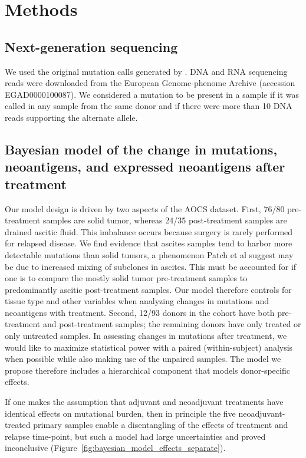 \section*{Methods}
\subsection*{Next-generation sequencing}
We used the original mutation calls generated by \cite{Patch_2015}. DNA and RNA sequencing reads were downloaded from the European Genome-phenome Archive (accession EGAD0000100087). We considered a mutation to be present in a sample if it was called in any sample from the same donor and if there were more than 10 DNA reads supporting the alternate allele.

\subsection*{Bayesian model of the change in mutations, neoantigens, and expressed neoantigens after treatment}
Our model design is driven by two aspects of the AOCS dataset. First, 76/80 pre-treatment samples are solid tumor, whereas 24/35 post-treatment samples are drained ascitic fluid. This imbalance occurs because surgery is rarely performed for relapsed disease. We find evidence that ascites samples tend to harbor more detectable mutations than solid tumors, a phenomenon Patch et al suggest may be due to increased mixing of subclones in ascites. This must be accounted for if one is to compare the mostly solid tumor pre-treatment samples to predominantly ascitic post-treatment samples. Our model therefore controls for tissue type and other variables when analyzing changes in mutations and neoantigens with treatment. Second, 12/93 donors in the cohort have both pre-treatment and post-treatment samples; the remaining donors have only treated or only untreated samples. In assessing changes in mutations after treatment, we would like to maximize statistical power with a paired (within-subject) analysis when possible while also making use of the unpaired samples. The model we propose therefore includes a hierarchical component that models donor-specific effects.

If one makes the assumption that adjuvant and neoadjuvant treatments have identical effects on mutational burden, then in principle the five neoadjuvant-treated primary samples enable a disentangling of the effects of treatment and relapse time-point, but such a model had large uncertainties and proved inconclusive (Figure~\ref{fig:bayesian_model_effects_separate}). 

